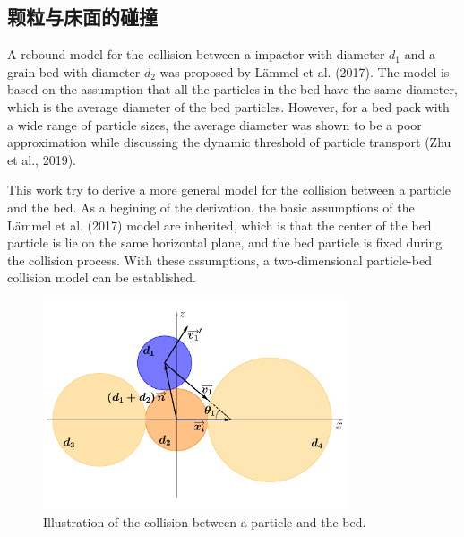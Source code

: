 \documentclass[12pt,a4paper]{article}
\begin{document}
\subsection{颗粒与床面的碰撞}
A rebound model for the collision between a impactor with diameter $d_1$ and a grain bed with diameter $d_2$ was proposed by L\"ammel et al. (2017). The model is based on the assumption that all the particles in the bed have the same diameter, which is the average diameter of the bed particles. However, for a bed pack with a wide range of particle sizes, the average diameter was shown to be a poor approximation while discussing the dynamic threshold of particle transport (Zhu et al., 2019).

This work try to derive a more general model for the collision between a particle and the bed. As a begining of the derivation, the basic assumptions of the L\"ammel et al. (2017) model are inherited, which is that the center of the bed particle is lie on the same horizontal plane, and the bed particle is fixed during the collision process. With these assumptions, a two-dimensional particle-bed collision model can be established.

\begin{figure}[H]
    \centering
    \includegraphics[width=0.8\textwidth]{fig1.pdf}
    \caption{Illustration of the collision between a particle and the bed.}
    \label{fig1}
\end{figure}
\end{document}
